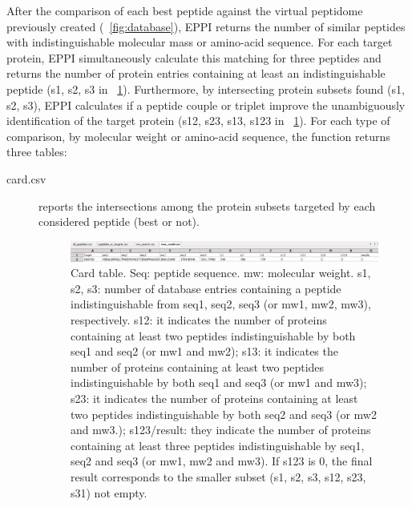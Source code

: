\documentclass[a4paper,14pt]{extarticle}
\begin{document}
After the comparison of each best peptide against the virtual peptidome previously created (\figurename~\ref{fig:database}), EPPI returns the number of similar peptides with indistinguishable molecular mass or amino-acid sequence. 
For each target protein, EPPI simultaneously calculate this matching for three peptides and returns the number of protein entries containing at least an indistinguishable peptide (s1, s2, s3 in \figurename~\ref{fig:card}). Furthermore, by intersecting protein subsets found (s1, s2, s3), EPPI calculates if a peptide couple or triplet improve the unambiguously identification of the target protein (s12, s23, s13, s123 in \figurename~\ref{fig:card}). For each type of comparison, by molecular weight or amino-acid sequence, the function returns three tables:
\begin{description}
\item[card.csv] reports the intersections among the protein subsets targeted by each considered peptide (best or not). 
\begin{figure}[htbp]
\begin{center}
\includegraphics[scale=0.5]{card}
\caption{Card table. Seq: peptide sequence. mw: molecular weight. s1, s2, s3: number of database entries containing a peptide indistinguishable from seq1, seq2, seq3 (or mw1, mw2, mw3), respectively. s12: it indicates the number of proteins containing at least two peptides indistinguishable by both seq1 and seq2 (or mw1 and mw2); s13: it indicates the number of proteins containing at least two peptides indistinguishable by both seq1 and seq3 (or mw1 and mw3); s23: it indicates the number of proteins containing at least two peptides indistinguishable by both seq2 and seq3 (or mw2 and mw3.); s123/result: they indicate the number of proteins containing at least three peptides indistinguishable by seq1, seq2 and seq3 (or mw1, mw2 and mw3). If s123 is 0, the final result corresponds to the smaller subset (s1, s2, s3, s12, s23, s31) not empty.}\label{fig:card}
\end{center}
\end{figure}


\end{description}
\end{document}
